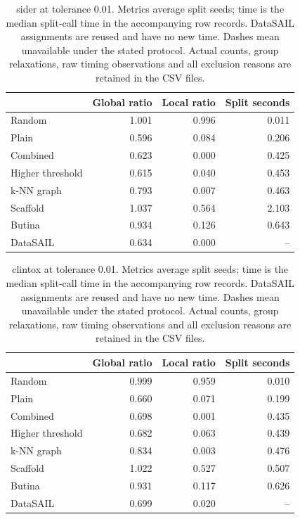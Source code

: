\begin{table}[htbp]\centering\small
\begin{tabular}{lrrr}
\toprule
 & Global ratio & Local ratio & Split seconds \\
\midrule
Random & 1.001 & 0.996 & 0.011 \\
Plain & 0.596 & 0.084 & 0.206 \\
Combined & 0.623 & 0.000 & 0.425 \\
Higher threshold & 0.615 & 0.040 & 0.453 \\
k-NN graph & 0.793 & 0.007 & 0.463 \\
Scaffold & 1.037 & 0.564 & 2.103 \\
Butina & 0.934 & 0.126 & 0.643 \\
DataSAIL & 0.634 & 0.000 & -- \\
\bottomrule
\end{tabular}

\caption{sider at tolerance 0.01. Metrics average split seeds; time is the median split-call time in the accompanying row records. DataSAIL assignments are reused and have no new time. Dashes mean unavailable under the stated protocol. Actual counts, group relaxations, raw timing observations and all exclusion reasons are retained in the CSV files.}\end{table}
\begin{table}[htbp]\centering\small
\begin{tabular}{lrrr}
\toprule
 & Global ratio & Local ratio & Split seconds \\
\midrule
Random & 0.999 & 0.959 & 0.010 \\
Plain & 0.660 & 0.071 & 0.199 \\
Combined & 0.698 & 0.001 & 0.435 \\
Higher threshold & 0.682 & 0.063 & 0.439 \\
k-NN graph & 0.834 & 0.003 & 0.476 \\
Scaffold & 1.022 & 0.527 & 0.507 \\
Butina & 0.931 & 0.117 & 0.626 \\
DataSAIL & 0.699 & 0.020 & -- \\
\bottomrule
\end{tabular}

\caption{clintox at tolerance 0.01. Metrics average split seeds; time is the median split-call time in the accompanying row records. DataSAIL assignments are reused and have no new time. Dashes mean unavailable under the stated protocol. Actual counts, group relaxations, raw timing observations and all exclusion reasons are retained in the CSV files.}\end{table}
